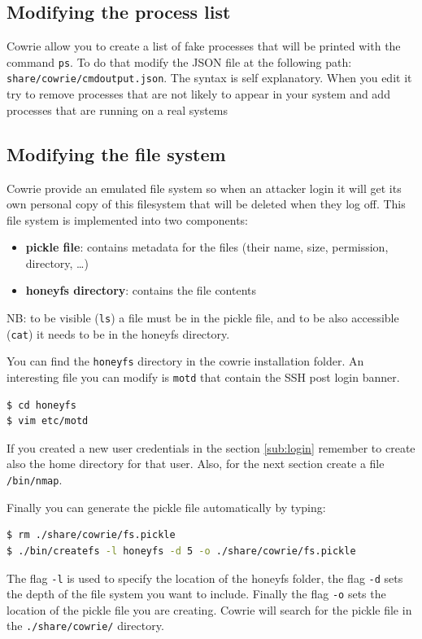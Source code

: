 \documentclass[epsfig,a4paper,11pt,titlepage,oneside,openany]{book}
\begin{document}
\subsection{Modifying the process list}
Cowrie allow you to create a list of fake processes that will be printed with the command \texttt{ps}. To do that modify the JSON file at the following path: \texttt{share/cowrie/cmdoutput.json}. The syntax is self explanatory. When you edit it try to remove processes that are not likely to appear in your system and add processes that are running on a real systems


\subsection{Modifying the file system}
Cowrie provide an emulated file system so when an attacker login it will get its own personal copy of this filesystem that will be deleted when they log off. This file system is implemented into two components:
\begin{itemize}
\itemsep0em 
\item \textbf{pickle file}: contains metadata for the files (their name, size, permission, directory, …)
\item \textbf{honeyfs directory}: contains the file contents
\end{itemize}

\noindent NB: to be visible (\texttt{ls}) a file must be in the pickle file, and to be also accessible (\texttt{cat}) it needs to be in the honeyfs directory.

You can find the \texttt{honeyfs} directory in the cowrie installation folder. An interesting file you can modify is \texttt{motd} that contain the SSH post login banner.
\begin{lstlisting}[language=bash]
$ cd honeyfs
$ vim etc/motd
\end{lstlisting}

If you created a new user credentials in the section \ref{sub:login} remember to create also the home directory for that user.
Also, for the next section create a file \texttt{/bin/nmap}.

Finally you can generate the pickle file automatically by typing:
\begin{lstlisting}[language=bash]
$ rm ./share/cowrie/fs.pickle
$ ./bin/createfs -l honeyfs -d 5 -o ./share/cowrie/fs.pickle
\end{lstlisting}
The flag \texttt{-l} is used to specify the location of the honeyfs folder, the flag \texttt{-d} sets the depth of the file system you want to include. Finally the flag \texttt{-o} sets the location of the pickle file you are creating. Cowrie will search for the pickle file in the \texttt{./share/cowrie/} directory.
\end{document}
